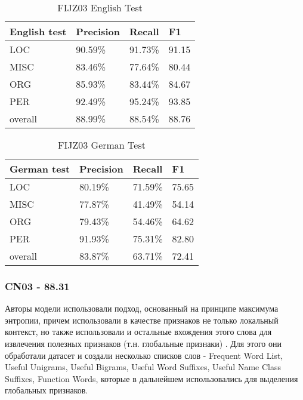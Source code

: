\begin{table}[ht]
\centering
\caption{FIJZ03 English Test}
\label{1place_eng}
\begin{tabular}{|l|l|l|l|}
\hline
\textbf{English test} & \textbf{Precision} & \textbf{Recall} & \textbf{F1} \\ \hline
LOC                   & 90.59\%            & 91.73\%         & 91.15       \\ \hline
MISC                  & 83.46\%            & 77.64\%         & 80.44       \\ \hline
ORG                   & 85.93\%            & 83.44\%         & 84.67       \\ \hline
PER                   & 92.49\%            & 95.24\%         & 93.85       \\ \hline
overall               & 88.99\%            & 88.54\%         & 88.76       \\ \hline
\end{tabular}
\end{table}

\begin{table}[ht]
\centering
\caption{FIJZ03 German Test}
\label{1place_ger}
\begin{tabular}{|l|l|l|l|}
\hline
\textbf{German test} & \textbf{Precision} & \textbf{Recall} & \textbf{F1} \\ \hline
LOC                  & 80.19\%            & 71.59\%         & 75.65       \\ \hline
MISC                 & 77.87\%            & 41.49\%         & 54.14       \\ \hline
ORG                  & 79.43\%            & 54.46\%         & 64.62       \\ \hline
PER                  & 91.93\%            & 75.31\%         & 82.80       \\ \hline
overall              & 83.87\%            & 63.71\%         & 72.41       \\ \hline
\end{tabular}
\end{table}

\subsubsection{CN03 - 88.31}

Авторы модели использовали подход, основанный на принципе максимума энтропии, причем использовали в качестве признаков не только локальный контекст, но также использовали и остальные вхождения этого слова для извлечения полезных признаков (т.н. глобальные признаки) \cite{Chieu:2003:NER:1119176.1119199}. Для этого они обработали датасет и создали несколько списков слов - Frequent Word List, Useful Unigrams, Useful Bigrams, Useful Word Suffixes, Useful Name Class Suffixes, Function Words, которые в дальнейшем использовались для выделения глобальных признаков. \\

